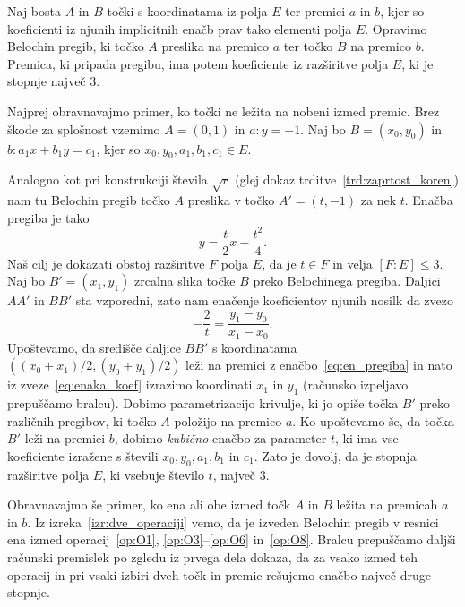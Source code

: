\begin{lema}
    \label{lema:O7_razširitev}
    Naj bosta $A$ in $B$ točki s koordinatama iz polja $E$ ter premici $a$ in $b$, kjer so koeficienti iz njunih implicitnih enačb prav tako elementi polja $E$. Opravimo Belochin pregib, ki točko $A$ preslika na premico $a$ ter točko $B$ na premico $b$. Premica, ki pripada pregibu, ima potem koeficiente iz razširitve polja $E$, ki je stopnje največ $3$.
\end{lema}
\begin{dokaz}
    Najprej obravnavajmo primer, ko točki ne ležita na nobeni izmed premic. Brez škode za splošnost vzemimo $A = (0,1)$ in $a : y = -1$. Naj bo $B = (x_0, y_0)$ in $b : a_1 x + b_1 y = c_1$, kjer so $x_0, y_0, a_1, b_1, c_1 \in E$.

    Analogno kot pri konstrukciji števila $\sqrt{r}$ (glej dokaz trditve~\ref{trd:zaprtost_koren}) nam tu Belochin pregib točko $A$ preslika v točko $A' = (t, -1)$ za nek $t$. Enačba pregiba je tako
    \begin{equation}
        \label{eq:en_pregiba}
        y = \frac{t}{2}x - \frac{t^2}{4}.
    \end{equation}
    Naš cilj je dokazati obstoj razširitve $F$ polja $E$, da je $t \in F$ in velja $[F:E] \leq 3$. Naj bo $B' = (x_1, y_1)$ zrcalna slika točke $B$ preko Belochinega pregiba. Daljici $AA'$ in $BB'$ sta vzporedni, zato nam enačenje koeficientov njunih nosilk da zvezo
    \begin{equation}
        \label{eq:enaka_koef}
        -\frac{2}{t} = \frac{y_1 - y_0}{x_1 - x_0}.
    \end{equation}
    Upoštevamo, da središče daljice $BB'$ s koordinatama $((x_0 + x_1)/2, (y_0 + y_1)/2)$ leži na premici z enačbo~\eqref{eq:en_pregiba} in nato iz zveze~\eqref{eq:enaka_koef} izrazimo koordinati $x_1$ in $y_1$ (računsko izpeljavo prepuščamo bralcu). Dobimo parametrizacijo krivulje, ki jo opiše točka $B'$ preko različnih pregibov, ki točko $A$ položijo na premico $a$. Ko upoštevamo še, da točka $B'$ leži na premici $b$, dobimo \emph{kubično} enačbo za parameter $t$, ki ima vse koeficiente izražene s števili $x_0, y_0, a_1, b_1$ in $c_1$. Zato je dovolj, da je stopnja razširitve polja $E$, ki vsebuje število $t$, največ $3$.

    Obravnavajmo še primer, ko ena ali obe izmed točk $A$ in $B$ ležita na premicah $a$ in $b$. Iz izreka~\ref{izr:dve_operaciji} vemo, da je izveden Belochin pregib v resnici ena izmed operacij~\ref{op:O1}, \ref{op:O3}--\ref{op:O6} in~\ref{op:O8}. Bralcu prepuščamo daljši računski premislek po zgledu iz prvega dela dokaza, da za vsako izmed teh operacij in pri vsaki izbiri dveh točk in premic rešujemo enačbo največ druge stopnje.
\end{dokaz}

